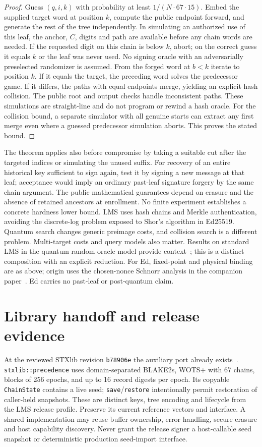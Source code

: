 \documentclass[10pt,twocolumn,letterpaper]{article}
\begin{document}
\begin{proof}
Guess $(q,i,k)$ with probability at least $1/(N\cdot67\cdot15)$. Embed the supplied target word at position $k$, compute the public endpoint forward, and generate the rest of the tree independently. In simulating an authorized use of this leaf, the anchor, $C$, digits and path are available before any chain words are needed. If the requested digit on this chain is below $k$, abort; on the correct guess it equals $k$ or the leaf was never used. No signing oracle with an adversarially preselected randomizer is assumed. From the forged word at $b<k$ iterate to position $k$. If it equals the target, the preceding word solves the predecessor game. If it differs, the paths with equal endpoints merge, yielding an explicit hash collision. The public root and output checks handle inconsistent paths. These simulations are straight-line and do not program or rewind a hash oracle. For the collision bound, a separate simulator with all genuine starts can extract any first merge even where a guessed predecessor simulation aborts. This proves the stated bound.
\end{proof}

The theorem applies also before compromise by taking a suitable cut after the targeted indices or simulating the unused suffix. For recovery of an entire historical key sufficient to sign again, test it by signing a new message at that leaf; acceptance would imply an ordinary past-leaf signature forgery by the same chain argument. The public mathematical guarantees depend on erasure and the absence of retained ancestors at enrollment. No finite experiment establishes a concrete hardness lower bound. LMS uses hash chains and Merkle authentication, avoiding the discrete-log problem exposed to Shor's algorithm in Ed25519. Quantum search changes generic preimage costs, and collision search is a different problem. Multi-target costs and query models also matter. Results on standard LMS in the quantum random-oracle model provide context~\cite{eaton}; this is a distinct composition with an explicit reduction. For Ed, fixed-point and physical binding are as above; origin uses the chosen-nonce Schnorr analysis in the companion paper~\cite{previous}. Ed carries no past-leaf or post-quantum claim.

\section{Library handoff and release evidence}
At the reviewed STXlib revision \texttt{b78906e} the auxiliary port already exists~\cite{stx,aux}. \texttt{stxlib::precedence} uses domain-separated BLAKE2s, WOTS+ with 67 chains, blocks of 256 epochs, and up to 16 record digests per epoch. Its copyable \texttt{ChainState} contains a live seed; \texttt{save}/\texttt{restore} intentionally permit restoration of caller-held snapshots. These are distinct keys, tree encoding and lifecycle from the LMS release profile. Preserve its current reference vectors and interface. A shared implementation may reuse buffer ownership, error handling, secure erasure and host capability discovery. Never grant the release signer a host-callable seed snapshot or deterministic production seed-import interface.
\end{document}
